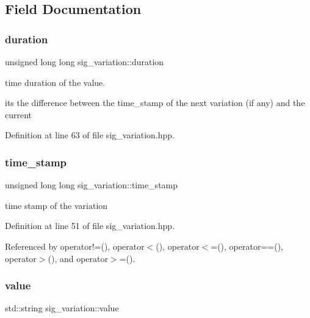 \subsection{Field Documentation}
\mbox{\label{structsig__variation_a9c3dba4fe347f37cd24dae789e79f815}} 
\subsubsection{\texorpdfstring{duration}{duration}}
{\footnotesize\ttfamily unsigned long long sig\+\_\+variation\+::duration}



time duration of the value. 

it\textquotesingle{}s the difference between the time\+\_\+stamp of the next variation (if any) and the current 

Definition at line 63 of file sig\+\_\+variation.\+hpp.

\mbox{\label{structsig__variation_a14e4cabe45be1cadeb2b1dc9bfa0febe}} 
\subsubsection{\texorpdfstring{time\+\_\+stamp}{time\_stamp}}
{\footnotesize\ttfamily unsigned long long sig\+\_\+variation\+::time\+\_\+stamp}



time stamp of the variation 



Definition at line 51 of file sig\+\_\+variation.\+hpp.



Referenced by operator!=(), operator$<$(), operator$<$=(), operator==(), operator$>$(), and operator$>$=().

\mbox{\label{structsig__variation_ada641a51a756b61614d619be6a772d09}} 
\subsubsection{\texorpdfstring{value}{value}}
{\footnotesize\ttfamily std\+::string sig\+\_\+variation\+::value}




